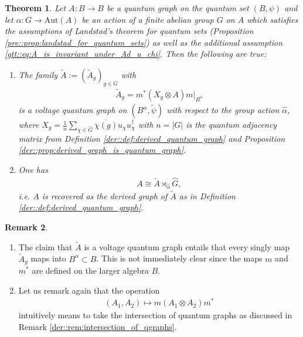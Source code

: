 \documentclass{amsart}
\newtheorem{thm}{Theorem}[section]
\theoremstyle{definition}
\newtheorem{remark}[thm]{Remark}
\theoremstyle{definition}
\begin{document}
\begin{thm}
    \label{gtt::thm:quantum_gross_tucker_theorem}
    Let $A: B \to B$ be a quantum graph on the quantum set $(B, \psi)$ and let $\alpha: G \to \mathrm{Aut}(A)$ be an action of a finite abelian group $G$ on $A$ which satisfies the assumptions of Landstad's theorem for quantum sets (Proposition \ref{pre::prop:landstad_for_quantum_sets}) as well as the additional assumption \eqref{gtt::eq:A_is_invariant_under_Ad_u_chi}. Then the following are true:
    \begin{enumerate}
        \item The family $\tilde{A} := (\tilde{A}_g)_{g \in G}$ with
        \begin{align*}
            \tilde{A}_g = m^\ast(X_g \otimes A) m|_{B^\alpha}
        \end{align*}
        is a voltage quantum graph on $(B^\alpha, \tilde{\psi})$ with respect to the group action $\hat{\alpha}$, where $X_g = \frac{1}{n} \sum_{\chi \in \hat{G}} \overline{\chi(g)} u_\chi u_\chi^\dagger$ with $n = |G|$ is the quantum adjacency matrix from Definition \ref{der::def:derived_quantum_graph} and Proposition \ref{der::prop:derived_graph_is_quantum_graph}. 
        
        \item One has
        \begin{align*}
            A \cong \tilde{A} \rtimes_{\hat{\alpha}} \hat{G},
        \end{align*}
        i.e. $A$ is recovered as the derived graph of $\tilde{A}$ as in Definition \ref{der::def:derived_quantum_graph}.
    \end{enumerate}
\end{thm}

\begin{remark}
    \begin{enumerate}
        \item The claim that $\tilde{A}$ is a voltage quantum graph entails that every singly map $\tilde{A}_g$ maps into $B^\alpha \subset B$. This is not immediately clear since the maps $m$ and $m^\ast$ are defined on the larger algebra $B$.
        \item Let us remark again that the operation
        \begin{align*}
            (A_1, A_2) \mapsto m(A_1 \otimes A_2) m^\ast
        \end{align*}
        intuitively means to take the intersection of quantum graphs as discussed in Remark \ref{der::rem:intersection_of_qgraphs}.
    \end{enumerate}
\end{remark}
\end{document}
